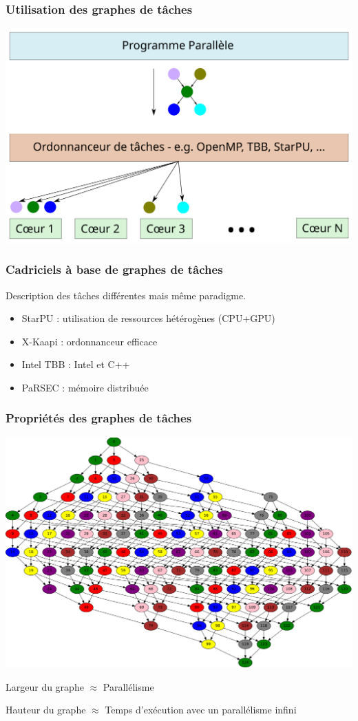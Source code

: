 \documentclass{beamer}
\begin{document}
\begin{frame}
  \frametitle{Utilisation des graphes de tâches}

  \centerline{\includegraphics[width=\linewidth]{runtime}}
\end{frame}


\begin{frame}
  \frametitle{Cadriciels à base de graphes de tâches}
  Description des tâches différentes mais même paradigme.
  \bigskip

  \begin{itemize}
    \item StarPU : utilisation de ressources hétérogènes (CPU+GPU)
    \item X-Kaapi : ordonnanceur efficace
    \item Intel TBB : Intel et C++
    \item PaRSEC : mémoire distribuée
  \end{itemize}
\end{frame}

\begin{frame}
  \frametitle{Propriétés des graphes de tâches}


  \centerline{\includegraphics[width=0.8\linewidth]{graphe_exemple}}


  Largeur du graphe $\approx$ Parallélisme


  Hauteur du graphe $\approx$ Temps d'exécution avec un parallélisme infini
\end{frame}
\end{document}

